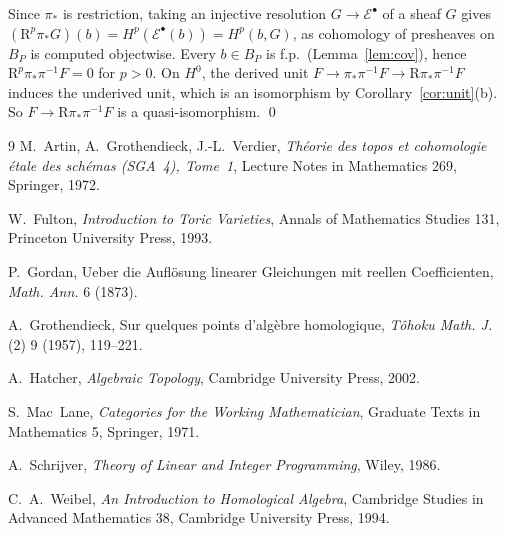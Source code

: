 \documentclass[11pt]{article}
\theoremstyle{definition}
\theoremstyle{remark}
\begin{document}
Since $\pi_*$ is restriction, taking an injective resolution $G\to\mathcal E^\bullet$ of a sheaf $G$ gives $(\mathrm R^p\pi_*G)(b)=H^p(\mathcal E^\bullet(b))=H^p(b,G)$, as cohomology of presheaves on $B_P$ is computed objectwise. Every $b\in B_P$ is f.p.\ (Lemma~\ref{lem:cov}), hence $\mathrm R^p\pi_*\pi^{-1}F=0$ for $p>0$. On $H^0$, the derived unit $F\to\pi_*\pi^{-1}F\to\mathrm R\pi_*\pi^{-1}F$ induces the underived unit, which is an isomorphism by Corollary~\ref{cor:unit}(b). So $F\to\mathrm R\pi_*\pi^{-1}F$ is a quasi-isomorphism. \qed

\begin{thebibliography}{9}
M.~Artin, A.~Grothendieck, J.-L.~Verdier, \emph{Théorie des topos et cohomologie étale des schémas (SGA~4), Tome~1}, Lecture Notes in Mathematics 269, Springer, 1972.

W.~Fulton, \emph{Introduction to Toric Varieties}, Annals of Mathematics Studies 131, Princeton University Press, 1993.

P.~Gordan, Ueber die Auflösung linearer Gleichungen mit reellen Coefficienten, \emph{Math. Ann.} 6 (1873).

A.~Grothendieck, Sur quelques points d'algèbre homologique, \emph{Tôhoku Math. J.} (2) 9 (1957), 119--221.

A.~Hatcher, \emph{Algebraic Topology}, Cambridge University Press, 2002.

S.~Mac~Lane, \emph{Categories for the Working Mathematician}, Graduate Texts in Mathematics 5, Springer, 1971.

A.~Schrijver, \emph{Theory of Linear and Integer Programming}, Wiley, 1986.

C.~A.~Weibel, \emph{An Introduction to Homological Algebra}, Cambridge Studies in Advanced Mathematics 38, Cambridge University Press, 1994.
\end{thebibliography}
\end{document}

